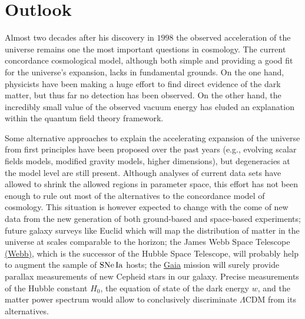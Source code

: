 \chapter{Outlook}
\label{chapter-outlook}

Almost two decades after his discovery in $1998$ the observed acceleration of the universe remains one the most important questions in cosmology. The current concordance cosmological model, although both simple and providing a good fit for the universe's expansion, lacks in fundamental grounds. On the one hand, physicists have been making a huge effort to find direct evidence of the dark matter, but thus far no detection has been observed. On the other hand, the incredibly small value of the observed vacuum energy has eluded an explanation within the quantum field theory framework. 

Some alternative approaches to explain the accelerating expansion of the universe from first principles have been proposed over the past years (e.g., evolving scalar fields models, modified gravity models, higher dimensions), but degeneracies at the model level are still present. Although analyses of current data sets have allowed to shrink the allowed regions in parameter space, this effort has not been enough to rule out most of the alternatives to the concordance model of cosmology. This situation is however expected to change with the come of new data from the new generation of both ground-based and space-based experiments; future galaxy surveys like Euclid which will map the distribution of matter in the universe at scales comparable to the horizon; the James Webb Space Telescope \href{www.jwst.nasa.gov}{(Webb)}, which is the successor of the Hubble Space Telescope, will probably help to augment the sample of $\mathrm{SNe\,Ia}$ hosts; the \href{www.cosmos.esa.int/web/gaia}{Gaia} mission will surely provide parallax measurements of new Cepheid stars in our galaxy. Precise measurements of the Hubble constant $H_0$, the equation of state of the dark energy $w$, and the matter power spectrum would allow to conclusively discriminate $\Lambda$CDM from its alternatives. 

